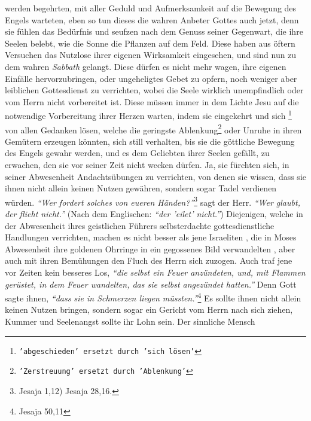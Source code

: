 werden begehrten, mit aller Geduld und Aufmerksamkeit auf
die Bewegung des
Engels warteten, eben so tun dieses die wahren Anbeter Gottes auch jetzt, denn
sie fühlen das Bedürfnis und seufzen nach dem Genuss seiner Gegenwart, die
ihre Seelen belebt, wie die Sonne die Pflanzen auf dem Feld. Diese haben aus
öftern Versuchen das Nutzlose ihrer eigenen Wirksamkeit eingesehen, und sind nun
zu dem wahren \textit{Sabbath}  gelangt. Diese dürfen es nicht
mehr wagen, ihre
eigenen Einfälle hervorzubringen, oder ungeheligtes Gebet zu opfern, noch
weniger aber leiblichen Gottesdienst zu verrichten, wobei die Seele wirklich
unempfindlich oder vom Herrn nicht vorbereitet ist. Diese müssen immer in dem
Lichte Jesu  auf die notwendige Vorbereitung ihrer Herzen
warten, indem sie
eingekehrt und sich \footnote{\texttt{'abgeschieden' ersetzt durch 'sich
lösen'}} von allen Gedanken lösen, welche die geringste
Ablenkung\footnote{\texttt{'Zerstreuung' ersetzt durch 'Ablenkung'}}
oder Unruhe in ihren Gemütern erzeugen könnten, sich still verhalten, bis sie
die göttliche Bewegung des Engels gewahr werden, und es dem Geliebten ihrer
Seelen gefällt, zu erwachen, den sie vor seiner Zeit nicht wecken dürfen. Ja,
sie fürchten sich, in seiner Abwesenheit Andachtsübungen zu verrichten, von
denen sie wissen, dass sie ihnen nicht allein keinen Nutzen gewähren, sondern
sogar Tadel verdienen würden.
\textit{"`Wer fordert solches von eueren Händen?"'}\footnote{Jesaja 1,12) Jesaja
28,16.}
sagt der Herr.
\textit{"`Wer glaubt, der flieht nicht."'} (Nach dem Englischen: \textit{"`der
'eilet' nicht."'}) Diejenigen,
welche in der Abwesenheit ihres geistlichen Führers selbsterdachte
gottesdienstliche Handlungen verrichten, machen es nicht besser als jene
Israeliten , die in Moses
Abwesenheit ihre goldenen Ohrringe in ein
gegossenes Bild verwandelten , aber auch mit ihren
Bemühungen den Fluch  des Herrn sich zuzogen. Auch traf jene vor
Zeiten kein besseres Los,
\textit{"`die selbst ein Feuer anzündeten, und, mit Flammen gerüstet, in dem
Feuer wandelten, das sie
selbst angezündet hatten."'} Denn Gott sagte ihnen,
\textit{"`dass sie in Schmerzen liegen müssten."'}\footnote{Jesaja 50,11}
Es sollte ihnen nicht allein keinen
Nutzen bringen, sondern sogar ein Gericht vom Herrn nach sich ziehen, Kummer und
Seelenangst sollte ihr Lohn sein. Der sinnliche Mensch
